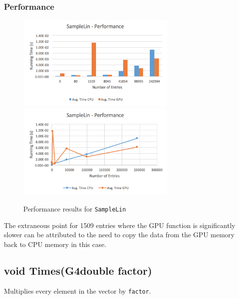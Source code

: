 \documentclass[12pt]{article}
\begin{document}
	\subsubsection{Performance}
		\begin{figure}[H]
    	\centering
    	\caption{Performance results for \texttt{SampleLin}}\label{figPerformanceSampleLin}
    	\includegraphics[width=0.7\textwidth]{samplelin_bar.png}
    	\includegraphics[width=0.7\textwidth]{samplelin_line.png}
    	\end{figure}
	The extraneous point for 1509 entries where the GPU function is significantly slower can be attributed to the need to copy the data from the GPU memory back to CPU memory in this case.

\subsection{void Times(G4double factor)} %
	
	Multiplies every element in the vector by \texttt{factor}.
	
\end{document}
